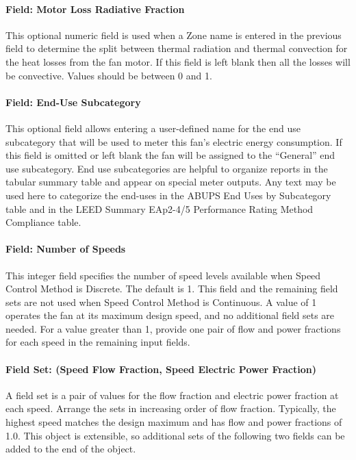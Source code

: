 \paragraph{Field: Motor Loss Radiative Fraction}\label{field-loss-rad-frac-fansysmodel}

This optional numeric field is used when a Zone name is entered in the previous field to determine the split between thermal radiation and thermal convection for the heat losses from the fan motor. If this field is left blank then all the losses will be convective.  Values should be between 0 and 1.

\paragraph{Field: End-Use Subcategory}\label{field-end-use-subcat-fansysmodel}

This optional field allows entering a user-defined name for the end use subcategory that will be used to meter this fan's electric energy consumption. If this field is omitted or left blank the fan will be assigned to the ``General'' end use subcategory.  End use subcategories are helpful to organize reports in the tabular summary table and appear on special meter outputs. Any text may be used here to categorize the end-uses in the ABUPS End Uses by Subcategory table and in the LEED Summary EAp2-4/5 Performance Rating Method Compliance table.

\paragraph{Field: Number of Speeds}\label{field-num-speeds-fansysmodel}

This integer field specifies the number of speed levels available when Speed Control Method is Discrete. The default is 1. This field and the remaining field sets are not used when Speed Control Method is Continuous. A value of 1 operates the fan at its maximum design speed, and no additional field sets are needed. For a value greater than 1, provide one pair of flow and power fractions for each speed in the remaining input fields.

\paragraph{Field Set: (Speed Flow Fraction, Speed Electric Power Fraction)}\label{fieldset-flow-power-fractions-fansysmodel}

A field set is a pair of values for the flow fraction and electric power fraction at each speed. Arrange the sets in increasing order of flow fraction. Typically, the highest speed matches the design maximum and has flow and power fractions of 1.0. This object is extensible, so additional sets of the following two fields can be added to the end of the object.

